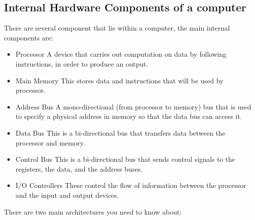 \subsection{Internal Hardware Components of a computer} \noindent
   There are several component that lie within a computer, the main internal components are:
  \begin{itemize}
    \setlength{\itemsep}{0em}
    \item Processor
      \subitem A device that carries out computation on data by following instructions, in order to produce an output.
    \item Main Memory
      \subitem This stores data and instructions that will be used by processor.
    \item Address Bus
      \subitem A mono-directional (from processor to memory) bus that is used to specify a physical address in memory so that the data bus can access it.
    \item Data Bus
      \subitem This is a bi-directional bus that transfers data between the processor and memory.
    \item Control Bus
      \subitem This is a bi-directional bus that sends control signals to the registers, the data, and the address buses.
    \item I/O Controllers
      \subitem These control the flow of information between the processor and the input and output devices.
  \end{itemize}
  There are two main architectures you need to know about:
